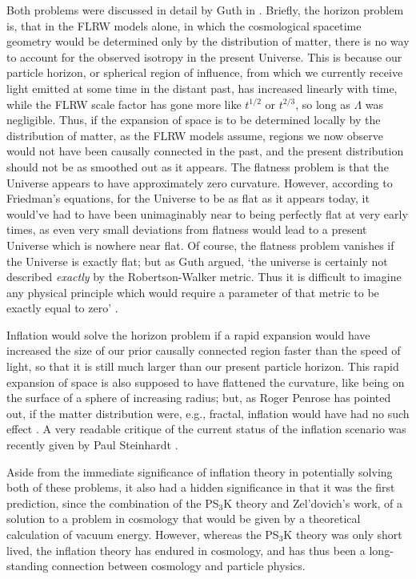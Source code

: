 Both problems were discussed in detail by Guth in \cite{Guth1981}. Briefly, the horizon problem is, that in the FLRW models alone, in which the cosmological spacetime geometry would be determined only by the distribution of matter, there is no way to account for the observed isotropy in the present Universe. This is because our particle horizon, or spherical region of influence, from which we currently receive light emitted at some time in the distant past, has increased linearly with time, while the FLRW scale factor has gone more like $t^{1/2}$ or $t^{2/3}$, so long as $\Lambda$ was negligible. Thus, if the expansion of space is to be determined locally by the distribution of matter, as the FLRW models assume, regions we now observe would not have been causally connected in the past, and the present distribution should not be as smoothed out as it appears. The flatness problem is that the Universe appears to have approximately zero curvature. However, according to Friedman's equations, for the Universe to be as flat as it appears today, it would've had to have been unimaginably near to being perfectly flat at very early times, as even very small deviations from flatness would lead to a present Universe which is nowhere near flat. Of course, the flatness problem vanishes if the Universe is exactly flat; but as Guth argued, `the universe is certainly not described \textit{exactly} by the Robertson-Walker metric. Thus it is difficult to imagine any physical principle which would require a parameter of that metric to be exactly equal to zero' \cite{Guth1981}.

Inflation would solve the horizon problem if a rapid expansion would have increased the size of our prior causally connected region faster than the speed of light, so that it is still much larger than our present particle horizon. This rapid expansion of space is also supposed to have flattened the curvature, like being on the surface of a sphere of increasing radius; but, as Roger Penrose has pointed out, if the matter distribution were, e.g., fractal, inflation would have had no such effect \cite{Penrose2005}. A very readable critique of the current status of the inflation scenario was recently given by Paul Steinhardt \cite{Steinhardt2011}.

Aside from the immediate significance of inflation theory in potentially solving both of these problems, it also had a hidden significance in that it was the first prediction, since the combination of the PS$_3$K theory and Zel'dovich's work, of a solution to a problem in cosmology that would be given by a theoretical calculation of vacuum energy. However, whereas the PS$_3$K theory was only short lived, the inflation theory has endured in cosmology, and has thus been a long-standing connection between cosmology and particle physics.

